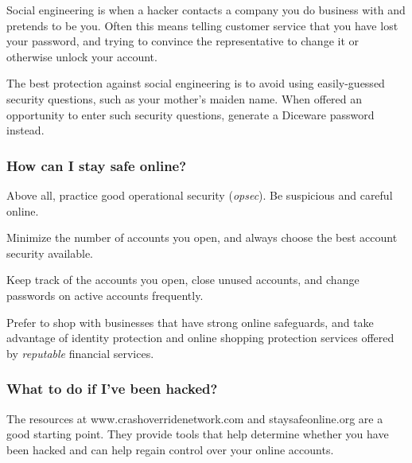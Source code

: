 Social engineering is when a hacker contacts a company you do business with and pretends to be you. Often this means telling customer service that you have lost your password, and trying to convince the representative to change it or otherwise unlock your account.

The best protection against social engineering is to avoid using easily-guessed security questions, such as your mother's maiden name. When offered an opportunity to enter such security questions, generate a Diceware password instead.

\subsubsection{How can I stay safe online?}

Above all, practice good operational security (\textit{opsec}). Be suspicious and careful online.

Minimize the number of accounts you open, and always choose the best account security available.

Keep track of the accounts you open, close unused accounts, and change passwords on active accounts frequently.

Prefer to shop with businesses that have strong online safeguards, and take advantage of identity protection and online shopping protection services offered by \textit{reputable} financial services.

\subsubsection{What to do if I've been hacked?}

The resources at www.crashoverridenetwork.com and staysafeonline.org are a good starting point. They provide tools that help determine whether you have been hacked and can help regain control over your online accounts.
